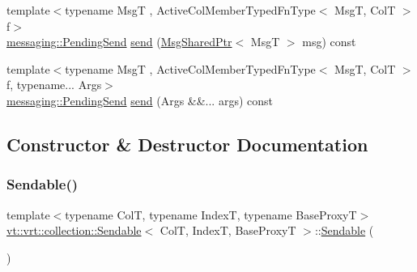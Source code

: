 \begin{DoxyCompactItemize}
\item 
{\footnotesize template$<$typename MsgT , Active\+Col\+Member\+Typed\+Fn\+Type$<$ Msg\+T, Col\+T $>$ f$>$ }\\\hyperlink{structvt_1_1messaging_1_1_pending_send}{messaging\+::\+Pending\+Send} \hyperlink{structvt_1_1vrt_1_1collection_1_1_sendable_aa8c102820895d01422c14e8c0993fc90}{send} (\hyperlink{namespacevt_ab2b3d506ec8e8d1540aede826d84a239}{Msg\+Shared\+Ptr}$<$ MsgT $>$ msg) const
\item 
{\footnotesize template$<$typename MsgT , Active\+Col\+Member\+Typed\+Fn\+Type$<$ Msg\+T, Col\+T $>$ f, typename... Args$>$ }\\\hyperlink{structvt_1_1messaging_1_1_pending_send}{messaging\+::\+Pending\+Send} \hyperlink{structvt_1_1vrt_1_1collection_1_1_sendable_a65e5494a18b398b52f12c056cff1dc16}{send} (Args \&\&... args) const
\end{DoxyCompactItemize}


\subsection{Constructor \& Destructor Documentation}
\mbox{\label{structvt_1_1vrt_1_1collection_1_1_sendable_a26f7014b7bb14f0e4b758b5b076834f1}} 
\subsubsection{\texorpdfstring{Sendable()}{Sendable()}\hspace{0.1cm}{\footnotesize\ttfamily [1/2]}}
{\footnotesize\ttfamily template$<$typename ColT, typename IndexT, typename Base\+ProxyT$>$ \\
\hyperlink{structvt_1_1vrt_1_1collection_1_1_sendable}{vt\+::vrt\+::collection\+::\+Sendable}$<$ ColT, IndexT, Base\+ProxyT $>$\+::\hyperlink{structvt_1_1vrt_1_1collection_1_1_sendable}{Sendable} (\begin{DoxyParamCaption}{ }\end{DoxyParamCaption})\hspace{0.3cm}{\ttfamily [default]}}

\mbox{\label{structvt_1_1vrt_1_1collection_1_1_sendable_aa4b3473480b076117715d1d21b53919b}} 
